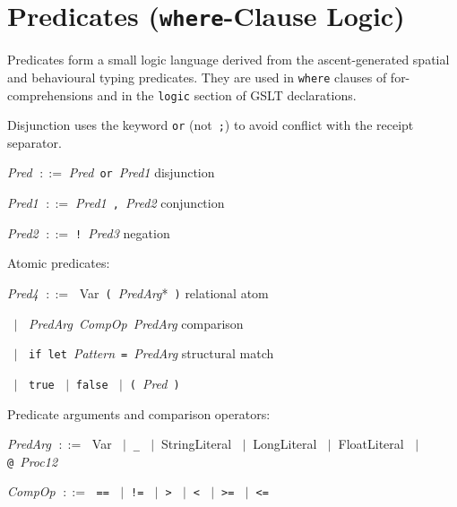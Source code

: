 \documentclass[11pt,a4paper]{article}
\newcommand{\kw}[1]{\texttt{\textcolor{kw}{#1}}}       %
\newcommand{\sym}[1]{\texttt{#1}}                       %
\newcommand{\nt}[1]{\textit{\textcolor{nt}{#1}}}        %
\newcommand{\tok}[1]{\textsf{#1}}                       %
\newcommand{\OR}{\ensuremath{\;\mid\;}}                  %
\newcommand{\bnfdef}{\ensuremath{\;::=\;}}               %
\newenvironment{grammar}{%
  \par\smallskip\begin{list}{}{%
    \setlength{\leftmargin}{1.5em}%
    \setlength{\itemsep}{2pt}%
    \setlength{\parsep}{0pt}}%
}{\end{list}\smallskip}
\begin{document}
\section{Predicates (\kw{where}-Clause Logic)}
\label{sec:pred}

Predicates form a small logic language derived from the ascent-generated
spatial and behavioural typing predicates.  They are used in \kw{where}
clauses of for-comprehensions and in the \kw{logic} section of GSLT
declarations.

Disjunction uses the keyword \kw{or} (not~\sym{;}) to avoid
conflict with the receipt separator.

\begin{grammar}
\item \nt{Pred}  \bnfdef \nt{Pred}~\kw{or}~\nt{Pred1}
    \hfill\textcolor{cmt}{disjunction}
\item \nt{Pred1} \bnfdef \nt{Pred1}~\sym{,}~\nt{Pred2}
    \hfill\textcolor{cmt}{conjunction}
\item \nt{Pred2} \bnfdef \sym{!}~\nt{Pred3}
    \hfill\textcolor{cmt}{negation}
\end{grammar}

\medskip\noindent Atomic predicates:

\begin{grammar}
\item \nt{Pred4} \bnfdef
    \tok{Var}~\sym{(}~\nt{PredArg}*~\sym{)}
    \hfill\textcolor{cmt}{relational atom}
\item \phantom{\nt{Pred4}} \OR
    \nt{PredArg}~\nt{CompOp}~\nt{PredArg}
    \hfill\textcolor{cmt}{comparison}
\item \phantom{\nt{Pred4}} \OR
    \kw{if}~\kw{let}~\nt{Pattern}~\sym{=}~\nt{PredArg}
    \hfill\textcolor{cmt}{structural match}
\item \phantom{\nt{Pred4}} \OR
    \kw{true} \OR \kw{false}
    \OR \sym{(}~\nt{Pred}~\sym{)}
\end{grammar}

\medskip\noindent Predicate arguments and comparison operators:

\begin{grammar}
\item \nt{PredArg} \bnfdef
    \tok{Var} \OR \sym{\_} \OR \tok{StringLiteral} \OR \tok{LongLiteral}
    \OR \tok{FloatLiteral} \OR \sym{@}~\nt{Proc12}
\item \nt{CompOp} \bnfdef
    \sym{==} \OR \sym{!=} \OR \sym{>} \OR \sym{<} \OR \sym{>=} \OR \sym{<=}
\end{grammar}
\end{document}
